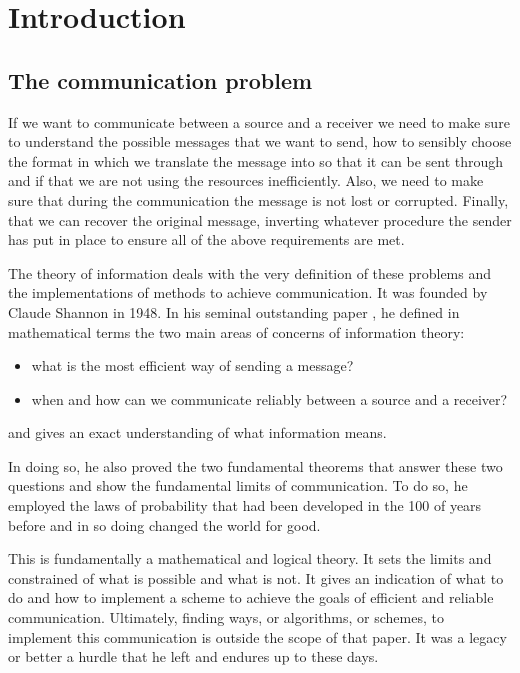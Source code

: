 
\chapter*{Introduction}

\section*{The communication problem}

If we want to communicate between a source and a receiver we need to make sure to understand the possible messages that we want to send, how to sensibly choose the format in which we translate the message into so that it can be sent through and if that we are not using the resources inefficiently. Also, we need to make sure that during the communication the message is not lost or corrupted. Finally, that we can recover the original message, inverting whatever procedure the sender has put in place to ensure all of the above requirements are met.

The theory of information deals with the very definition of these problems and the implementations of methods to achieve communication. It was founded by Claude Shannon in 1948. In his seminal outstanding paper \cite{shannon}, he defined in mathematical terms the two main areas of concerns of information theory:
\begin{itemize}
	\item what is the most efficient way of sending a message?
	\item when and how can we communicate reliably between a source and a receiver?
\end{itemize}
and gives an exact understanding of what information means.

In doing so, he also proved the two fundamental theorems that answer these two questions and show the fundamental limits of communication.  To do so, he employed the laws of probability that had been developed in the 100 of years before and in so doing changed the world for good.

This is fundamentally a mathematical and logical theory. It sets the limits and constrained of what is possible and what is not. It gives an indication of what to do and how to implement a scheme to achieve the goals of efficient and reliable  communication. Ultimately, finding ways, or algorithms, or schemes, to implement this communication is outside the scope of that paper. It was a legacy or better a hurdle that he left and endures up to these days.



